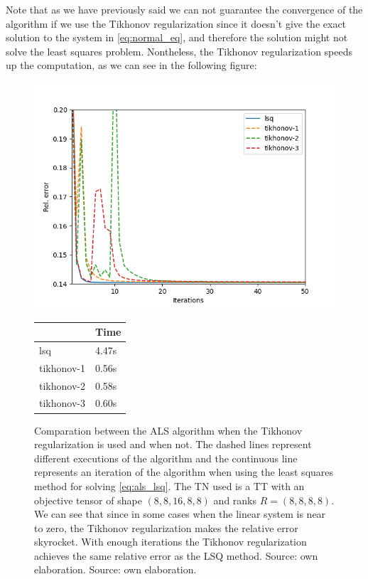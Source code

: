 \documentclass[11pt,a4paper,openright,oneside]{book}
\numberwithin{equation}{section}
\newcommand{\refeq}[1]{\cref{#1}}
\begin{document}
{Note that as we have previously said we can not guarantee the convergence of the algorithm if we use the Tikhonov regularization since it doesn't give
the exact solution to the system in \refeq{eq:normal_eq}, and therefore the solution might not
solve the least squares problem. Nontheless, the Tikhonov regularization speeds up the 
computation, as we can see in the following figure:

\begin{figure}[H]
    \centering
    
   \begin{minipage}{0.6\textwidth}
    \includegraphics[width=\linewidth]{media/tikhonov-chart.png}
\end{minipage}
\begin{minipage}{0.3\textwidth}
    \centering
\begin{tabular}{l|l}
           & Time  \\ \hline
lsq        & 4.47s \\
tikhonov-1 & 0.56s \\
tikhonov-2 & 0.58s \\
tikhonov-3 & 0.60s
\end{tabular}
\end{minipage}

    \caption{Comparation between the ALS algorithm when the Tikhonov regularization is used and when not. The dashed lines
    represent different executions of the algorithm and the continuous line represents an iteration of the
    algorithm when using the least squares method for solving \ref{eq:als_lsq}. The TN used
    is a TT with an objective tensor of shape $(8,8,16,8,8)$ and ranks $R = (8,8,8,8)$.
    We can see that
    since in some cases when the linear system is near to zero, the Tikhonov regularization makes the relative
    error skyrocket. With enough iterations the Tikhonov regularization achieves the same
    relative error as the LSQ method. Source: own elaboration.
    Source: own elaboration.}
    \label{fig:als-convergence-tiknov}
\end{figure}

}
\end{document}
